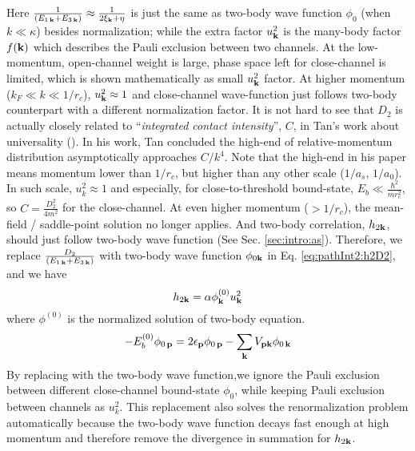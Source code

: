  
 




Here $\frac{1}{(E_{1\,\mathbf{k}}+E_{3\,\mathbf{k}})}\approx\frac{1}{2\xi_{\mathbf{k}}+\eta}$ is just the same as two-body wave function $\phi_{0}$ (when $k\ll\kappa$) besides normalization; while the extra factor $u_{\mathbf{k}}^{2}$ is the many-body factor $f(\mathbf{k})$ which describes the Pauli exclusion between two channels.  At the low-momentum, open-channel weight is large, phase space left for close-channel is limited, which is shown mathematically as small $u_{\mathbf{k}}^{2}$ factor.   At higher momentum ($k_{F}\ll{k}\ll1/r_{c}$), $u_{\mathbf{k}}^{2}\approx1$ and close-channel wave-function just follows two-body counterpart with a different normalization factor.   It is not hard to see that $D_{2}$ is actually closely related to ``\emph{integrated contact intensity}'', $C$, in Tan's work about universality (\cite{Tan2008-1,Tan2008-2}).  In his work, Tan concluded  the high-end of relative-momentum distribution asymptotically approaches  $C/k^{4}$.  Note that the high-end in his paper means momentum lower than $1/r_{c}$, but higher than any other scale ($1/a_{s}$, $1/a_{0}$).  In such scale, $u_{k}^2\approx1$ and especially, for close-to-threshold bound-state, $E_{b}\ll{}\frac{\hbar^{2}}{mr_{c}^{2}}$, so $C=\frac{D_{2}^{2}}{4m^{2}}$ for the close-channel.   
At even higher momentum ($>1/r_{c}$), the mean-field / saddle-point solution no longer applies.  And  two-body correlation, $h_{2\mathbf{k}}$, should just follow two-body wave function (See Sec. \ref{sec:intro:as}).  Therefore, we replace $\frac{D_{2}}{(E_{1\,\mathbf{k}}+E_{3\,\mathbf{k}})}$ with two-body wave function $\phi_{0\mathbf{k}}$ in Eq. \ref{eq:pathInt2:h2D2}, and we have 
\begin{equation}\label{eq:pathInt2:hphi}
h_{2\mathbf{k}}=\alpha\phi^{(0)}_{\mathbf{k}}u_{\mathbf{k}}^{2}
\end{equation}
where $\phi^{(0)}$ is the normalized solution of  two-body \sch equation.
\begin{equation}\label{eq:pathInt2:phi}
-E_{b}^{(0)}\phi_{0\,\mathbf{p}}=2\epsilon_{\mathbf{p}}\phi_{0\,\mathbf{p}}-\sum_{\mathbf{k}}V_{\mathbf{p}\mathbf{k}} \phi_{0\,\mathbf{k}}
\end{equation}
By replacing with the two-body wave function,we ignore the Pauli exclusion between different close-channel bound-state $\phi_{0}$, while keeping Pauli exclusion between channels as $u_{k}^{2}$.
This replacement also solves the renormalization problem automatically because the two-body wave function decays fast enough at high momentum and therefore remove the divergence in summation for $h_{2\mathbf{k}}$.  


